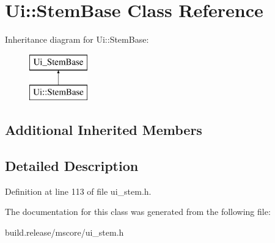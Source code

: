 \hypertarget{class_ui_1_1_stem_base}{}\section{Ui\+:\+:Stem\+Base Class Reference}
\label{class_ui_1_1_stem_base}
Inheritance diagram for Ui\+:\+:Stem\+Base\+:\begin{figure}[H]
\begin{center}
\leavevmode
\includegraphics[height=2.000000cm]{class_ui_1_1_stem_base}
\end{center}
\end{figure}
\subsection*{Additional Inherited Members}


\subsection{Detailed Description}


Definition at line 113 of file ui\+\_\+stem.\+h.



The documentation for this class was generated from the following file\+:\begin{DoxyCompactItemize}
\item 
build.\+release/mscore/ui\+\_\+stem.\+h\end{DoxyCompactItemize}
